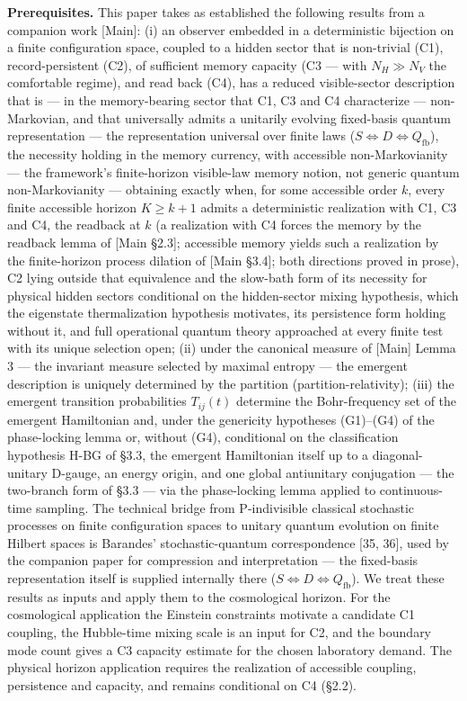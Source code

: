 \documentclass[
]{article}
\begin{document}
\textbf{Prerequisites.} This paper takes as established the following
results from a companion work {[}Main{]}: (i) an observer embedded in a
deterministic bijection on a finite configuration space, coupled to a
hidden sector that is non-trivial (C1), record-persistent (C2), of
sufficient memory capacity (C3 --- with \(N_H \gg N_V\) the comfortable
regime), and read back (C4), has a reduced visible-sector description
that is --- in the memory-bearing sector that C1, C3 and C4 characterize
--- non-Markovian, and that universally admits a unitarily evolving
fixed-basis quantum representation --- the representation universal over
finite laws (\(S \iff D \iff Q_{\mathrm{fb}}\)), the necessity holding
in the memory currency, with accessible non-Markovianity --- the
framework's finite-horizon visible-law memory notion, not generic
quantum non-Markovianity --- obtaining exactly when, for some accessible
order \(k\), every finite accessible horizon \(K \geq k+1\) admits a
deterministic realization with C1, C3 and C4, the readback at \(k\) (a
realization with C4 forces the memory by the readback lemma of {[}Main
§2.3{]}; accessible memory yields such a realization by the
finite-horizon process dilation of {[}Main §3.4{]}; both directions
proved in prose), C2 lying outside that equivalence and the slow-bath
form of its necessity for physical hidden sectors conditional on the
hidden-sector mixing hypothesis, which the eigenstate thermalization
hypothesis motivates, its persistence form holding without it, and full
operational quantum theory approached at every finite test with its
unique selection open; (ii) under the canonical measure of {[}Main{]}
Lemma 3 --- the invariant measure selected by maximal entropy --- the
emergent description is uniquely determined by the partition
(partition-relativity); (iii) the emergent transition probabilities
\(T_{ij}(t)\) determine the Bohr-frequency set of the emergent
Hamiltonian and, under the genericity hypotheses (G1)--(G4) of the
phase-locking lemma or, without (G4), conditional on the classification
hypothesis H-BG of §3.3, the emergent Hamiltonian itself up to a
diagonal-unitary D-gauge, an energy origin, and one global antiunitary
conjugation --- the two-branch form of §3.3 --- via the phase-locking
lemma applied to continuous-time sampling. The technical bridge from
P-indivisible classical stochastic processes on finite configuration
spaces to unitary quantum evolution on finite Hilbert spaces is
Barandes' stochastic-quantum correspondence {[}35, 36{]}, used by the
companion paper for compression and interpretation --- the fixed-basis
representation itself is supplied internally there
(\(S \iff D \iff Q_{\mathrm{fb}}\)). We treat these results as inputs
and apply them to the cosmological horizon. For the cosmological
application the Einstein constraints motivate a candidate C1 coupling,
the Hubble-time mixing scale is an input for C2, and the boundary mode
count gives a C3 capacity estimate for the chosen laboratory demand. The
physical horizon application requires the realization of accessible
coupling, persistence and capacity, and remains conditional on C4
(§2.2).
\end{document}
